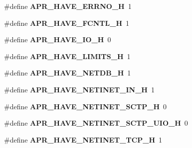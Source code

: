 \begin{DoxyCompactItemize}
\item 
\hypertarget{group__apr__platform_gabb48338e636d4184f28d8fb08f449f6b}{\#define {\bfseries A\-P\-R\-\_\-\-H\-A\-V\-E\-\_\-\-E\-R\-R\-N\-O\-\_\-\-H}~1}\label{group__apr__platform_gabb48338e636d4184f28d8fb08f449f6b}

\item 
\hypertarget{group__apr__platform_ga40e3ceafec2098262742573bb28797cf}{\#define {\bfseries A\-P\-R\-\_\-\-H\-A\-V\-E\-\_\-\-F\-C\-N\-T\-L\-\_\-\-H}~1}\label{group__apr__platform_ga40e3ceafec2098262742573bb28797cf}

\item 
\hypertarget{group__apr__platform_ga2cf42c89ca9d5682dba7b12377342cc0}{\#define {\bfseries A\-P\-R\-\_\-\-H\-A\-V\-E\-\_\-\-I\-O\-\_\-\-H}~0}\label{group__apr__platform_ga2cf42c89ca9d5682dba7b12377342cc0}

\item 
\hypertarget{group__apr__platform_ga449046121ca29eda9759cb2d30442e80}{\#define {\bfseries A\-P\-R\-\_\-\-H\-A\-V\-E\-\_\-\-L\-I\-M\-I\-T\-S\-\_\-\-H}~1}\label{group__apr__platform_ga449046121ca29eda9759cb2d30442e80}

\item 
\hypertarget{group__apr__platform_gac92f65f1d27253f3af6d9714e4604550}{\#define {\bfseries A\-P\-R\-\_\-\-H\-A\-V\-E\-\_\-\-N\-E\-T\-D\-B\-\_\-\-H}~1}\label{group__apr__platform_gac92f65f1d27253f3af6d9714e4604550}

\item 
\hypertarget{group__apr__platform_gab7a6381062416846012d9a0676e0f35c}{\#define {\bfseries A\-P\-R\-\_\-\-H\-A\-V\-E\-\_\-\-N\-E\-T\-I\-N\-E\-T\-\_\-\-I\-N\-\_\-\-H}~1}\label{group__apr__platform_gab7a6381062416846012d9a0676e0f35c}

\item 
\hypertarget{group__apr__platform_ga933a3c59c351de4f17cfb8601649fd91}{\#define {\bfseries A\-P\-R\-\_\-\-H\-A\-V\-E\-\_\-\-N\-E\-T\-I\-N\-E\-T\-\_\-\-S\-C\-T\-P\-\_\-\-H}~0}\label{group__apr__platform_ga933a3c59c351de4f17cfb8601649fd91}

\item 
\hypertarget{group__apr__platform_ga1bb6606091cafba71be8c37796d36e8a}{\#define {\bfseries A\-P\-R\-\_\-\-H\-A\-V\-E\-\_\-\-N\-E\-T\-I\-N\-E\-T\-\_\-\-S\-C\-T\-P\-\_\-\-U\-I\-O\-\_\-\-H}~0}\label{group__apr__platform_ga1bb6606091cafba71be8c37796d36e8a}

\item 
\hypertarget{group__apr__platform_ga2cf9c403892bb0830f24e58b614b8bce}{\#define {\bfseries A\-P\-R\-\_\-\-H\-A\-V\-E\-\_\-\-N\-E\-T\-I\-N\-E\-T\-\_\-\-T\-C\-P\-\_\-\-H}~1}\label{group__apr__platform_ga2cf9c403892bb0830f24e58b614b8bce}


\end{DoxyCompactItemize}
